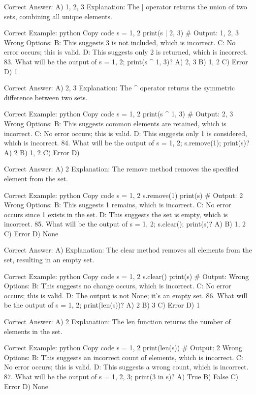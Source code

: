 Correct Answer: A) {1, 2, 3}
Explanation: The | operator returns the union of two sets, combining all unique elements.

Correct Example:
python
Copy code
s = {1, 2}
print(s | {2, 3})  # Output: {1, 2, 3}
Wrong Options:
B: This suggests 3 is not included, which is incorrect.
C: No error occurs; this is valid.
D: This suggests only 2 is returned, which is incorrect.
83. What will be the output of s = {1, 2}; print(s ^ {1, 3})?
A) {2, 3}
B) {1, 2}
C) Error
D) {1}

Correct Answer: A) {2, 3}
Explanation: The ^ operator returns the symmetric difference between two sets.

Correct Example:
python
Copy code
s = {1, 2}
print(s ^ {1, 3})  # Output: {2, 3}
Wrong Options:
B: This suggests common elements are retained, which is incorrect.
C: No error occurs; this is valid.
D: This suggests only 1 is considered, which is incorrect.
84. What will be the output of s = {1, 2}; s.remove(1); print(s)?
A) {2}
B) {1, 2}
C) Error
D) {}

Correct Answer: A) {2}
Explanation: The remove method removes the specified element from the set.

Correct Example:
python
Copy code
s = {1, 2}
s.remove(1)
print(s)  # Output: {2}
Wrong Options:
B: This suggests 1 remains, which is incorrect.
C: No error occurs since 1 exists in the set.
D: This suggests the set is empty, which is incorrect.
85. What will be the output of s = {1, 2}; s.clear(); print(s)?
A) {}
B) {1, 2}
C) Error
D) None

Correct Answer: A) {}
Explanation: The clear method removes all elements from the set, resulting in an empty set.

Correct Example:
python
Copy code
s = {1, 2}
s.clear()
print(s)  # Output: {}
Wrong Options:
B: This suggests no change occurs, which is incorrect.
C: No error occurs; this is valid.
D: The output is not None; it’s an empty set.
86. What will be the output of s = {1, 2}; print(len(s))?
A) 2
B) 3
C) Error
D) 1

Correct Answer: A) 2
Explanation: The len function returns the number of elements in the set.

Correct Example:
python
Copy code
s = {1, 2}
print(len(s))  # Output: 2
Wrong Options:
B: This suggests an incorrect count of elements, which is incorrect.
C: No error occurs; this is valid.
D: This suggests a wrong count, which is incorrect.
87. What will be the output of s = {1, 2, 3}; print(3 in s)?
A) True
B) False
C) Error
D) None

